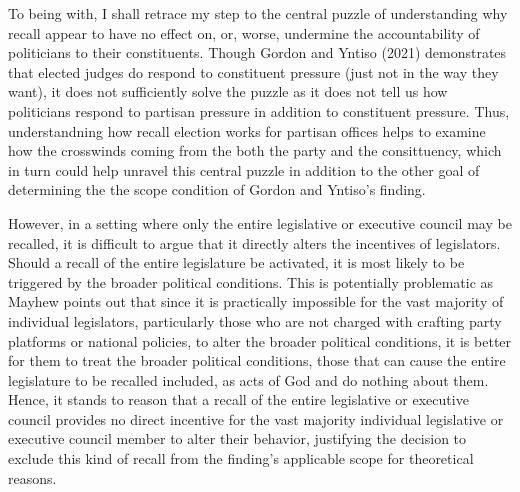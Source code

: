 \documentclass[hyphens, crop=false]{standalone}
\begin{document}
		To being with,
		I shall retrace my step to the central puzzle of understanding why
		recall appear to have no effect on,
		or, worse, undermine the accountability of politicians to their constituents.
		Though Gordon and Yntiso (2021)
		demonstrates that elected judges do respond to constituent pressure (just not in the way they want),
		it does not sufficiently solve the puzzle as
		it does not tell us how politicians respond to partisan pressure in addition to constituent pressure.
		Thus,
		understandning how recall election works for partisan offices helps to examine how
		the crosswinds coming from the both the party and the consittuency,
		which in turn
		could help unravel this central puzzle
		in addition to the other goal of
		determining the
		the scope condition of
		Gordon and Yntiso's
		finding.
		
		However,
		in a setting where only
		the entire
		legislative or executive council may be recalled,
		it is difficult to argue that it directly alters the incentives of legislators.
		Should a recall of the entire legislature
		be activated,
		it is most likely to be triggered by
		the broader political conditions.
		This is potentially problematic as
		Mayhew
		\autocite*{mayhewCongressElectoralConnection1974}
		points out that since
		it is practically impossible for the vast majority of
		individual legislators,
		particularly those who are not charged with crafting party platforms or national policies,
		to alter the broader political conditions,
		it is better for them to treat the broader political conditions,
		those that can cause the entire legislature to be recalled included,
		as acts of God and do nothing about them.
		Hence, it stands to reason that a recall of the entire legislative or executive council
		provides no direct incentive for the vast majority individual legislative or executive council member
		to alter their behavior,
		justifying the decision to exclude this kind of recall from the finding's applicable scope for theoretical reasons.
\end{document}

